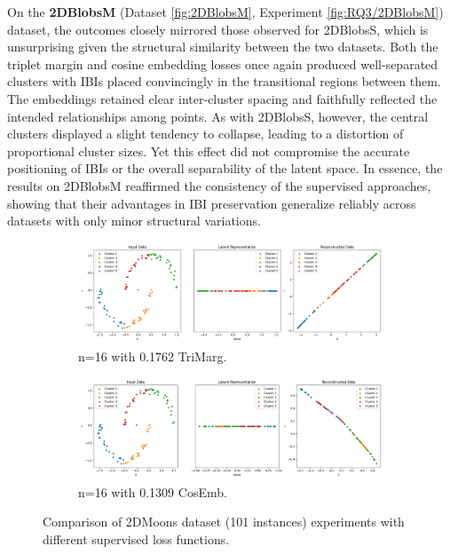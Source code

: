 On the \textbf{2DBlobsM} (Dataset \ref{fig:2DBlobsM}, Experiment \ref{fig:RQ3/2DBlobsM}) dataset, the outcomes closely mirrored those observed for 2DBlobsS, which is unsurprising given the structural similarity between the two datasets. Both the triplet margin and cosine embedding losses once again produced well-separated clusters with IBIs placed convincingly in the transitional regions between them. The embeddings retained clear inter-cluster spacing and faithfully reflected the intended relationships among points. As with 2DBlobsS, however, the central clusters displayed a slight tendency to collapse, leading to a distortion of proportional cluster sizes. Yet this effect did not compromise the accurate positioning of IBIs or the overall separability of the latent space. In essence, the results on 2DBlobsM reaffirmed the consistency of the supervised approaches, showing that their advantages in IBI preservation generalize reliably across datasets with only minor structural variations.

\begin{figure}[htbp]
  \centering
  \begin{subfigure}[b]{1.0\textwidth}
    \centering
    \includegraphics[width=\linewidth]{images/RQ3/tri/2DMoons_16_0.1762.png}
    \caption{n=16 with 0.1762 TriMarg.}
    \label{fig:RQ3/tri/2DMoons}
  \end{subfigure}
  \hfill
  \begin{subfigure}[b]{1.0\textwidth}
    \centering
    \includegraphics[width=\linewidth]{images/RQ3/cos/2DMoons_16_0.1309.png}
    \caption{n=16 with 0.1309 CosEmb.}
    \label{fig:RQ3/cos/2DMoons}
  \end{subfigure} 

  \caption{Comparison of 2DMoons dataset (101 instances) experiments with different
supervised loss functions.}
  \label{fig:RQ3/2DMoons}
\end{figure}

